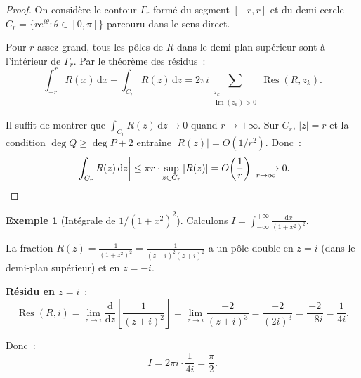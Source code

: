 \documentclass[12pt,a4paper,openany]{book}
\theoremstyle{definition}
\newtheorem{exemple}[definition]{Exemple}
\theoremstyle{plain}
\theoremstyle{remark}
\DeclareMathOperator{\re}{Re}
\DeclareMathOperator{\im}{Im}
\DeclareMathOperator{\Res}{Res}
\newcommand{\dd}{\mathrm{d}}
\newcommand{\abs}[1]{\left|#1\right|}
\begin{document}
\begin{proof}
On considère le contour $\Gamma_r$ formé du segment $[-r, r]$ et du demi-cercle
$C_r = \{re^{i\theta} : \theta \in [0, \pi]\}$ parcouru dans le sens direct.

\begin{center}
\end{center}

Pour $r$ assez grand, tous les pôles de $R$ dans le demi-plan supérieur sont
à l'intérieur de $\Gamma_r$. Par le théorème des résidus~:
\[
  \int_{-r}^{r} R(x)\, \dd x + \int_{C_r} R(z)\, \dd z
  = 2\pi i \sum_{\substack{z_k \\ \im(z_k) > 0}} \Res(R, z_k).
\]

Il suffit de montrer que $\int_{C_r} R(z)\, \dd z \to 0$ quand $r \to +\infty$.
Sur $C_r$, $\abs{z} = r$ et la condition $\deg Q \geq \deg P + 2$ entraîne
$\abs{R(z)} = O(1/r^2)$. Donc~:
\[
  \left|\int_{C_r} R(z)\, \dd z\right|
  \leq \pi r \cdot \sup_{z \in C_r} \abs{R(z)}
  = O\!\left(\frac{1}{r}\right) \xrightarrow[r \to \infty]{} 0. \qedhere
\]
\end{proof}

\begin{exemple}[Intégrale de $1/(1+x^2)^2$]\label{ex:int-1-plus-x2-carre}
Calculons $\displaystyle I = \int_{-\infty}^{+\infty} \frac{\dd x}{(1+x^2)^2}$.

La fraction $R(z) = \frac{1}{(1+z^2)^2} = \frac{1}{(z-i)^2(z+i)^2}$
a un pôle double en $z = i$ (dans le demi-plan supérieur) et en $z = -i$.

\textbf{Résidu en $z = i$}~:
\[
  \Res(R, i) = \lim_{z \to i} \frac{\dd}{\dd z}\!\left[\frac{1}{(z+i)^2}\right]
  = \lim_{z \to i} \frac{-2}{(z+i)^3} = \frac{-2}{(2i)^3} = \frac{-2}{-8i} = \frac{1}{4i}.
\]

Donc~:
\[
  I = 2\pi i \cdot \frac{1}{4i} = \frac{\pi}{2}.
\]
\end{exemple}
\end{document}
